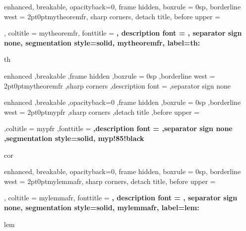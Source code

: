 {%
	enhanced,
	breakable,
	opacityback=0,
	frame hidden,
	boxrule = 0sp,
	borderline west = {2pt}{0pt}{mytheoremfr},
	sharp corners,
	detach title,
	before upper = \tcbtitle\par\smallskip,
	coltitle = mytheoremfr,
	fonttitle = \bfseries\sffamily,
	description font = \mdseries,
	separator sign none,
	segmentation style={solid, mytheoremfr},
    label={th:\thetcbcounter}
}
{th}

{%
	enhanced
	,breakable
	,frame hidden
	,boxrule = 0sp
	,borderline west = {2pt}{0pt}{mytheoremfr}
	,sharp corners
	,description font = \mdseries
	,separator sign none
}
{%
	enhanced
	,breakable
	,opacityback=0
	,frame hidden
	,boxrule = 0sp
	,borderline west = {2pt}{0pt}{mypfr}
	,sharp corners
	,detach title
	,before upper = \tcbtitle\par\smallskip
	,coltitle = mypfr
	,fonttitle = \bfseries\sffamily
	,description font = \mdseries
	,separator sign none
	,segmentation style={solid, myp!85!black}
}{cor}

{%
	enhanced,
	breakable,
	opacityback=0,
	frame hidden,
	boxrule = 0sp,
	borderline west = {2pt}{0pt}{mylemmafr},
	sharp corners,
	detach title,
	before upper = \tcbtitle\par\smallskip,
	coltitle = mylemmafr,
	fonttitle = \bfseries\sffamily,
	description font = \mdseries,
	separator sign none,
	segmentation style={solid, mylemmafr},
    label={lem:\thetcbcounter}
}
{lem}


